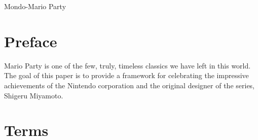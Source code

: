 \documentclass{article}
\begin{document}
\begin{center}
{\LARGE Mondo-Mario Party}
\end{center}

\section{Preface}

Mario Party is one of the few, truly, timeless classics we have left in
this world.  The goal of this paper is to provide a framework for celebrating
the impressive achievements of the Nintendo corporation and the original
designer of the series, Shigeru Miyamoto.

\section{Terms}
\end{document}
